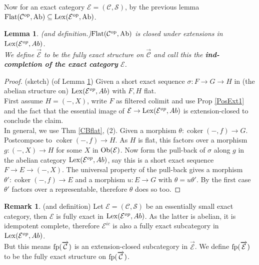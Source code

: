 \documentclass[11pt,a4paper]{amsart}
\theoremstyle{plain}
\newtheorem{lem}[thm]{Lemma}
\theoremstyle{definition}
\newtheorem{rem}[thm]{Remark}
\DeclareMathOperator{\coKer}{coker}
\newcommand{\mcC}{\mathcal{C}}
\newcommand{\mcE}{\mathcal{E}}
\newcommand{\mcS}{\mathcal{S}}
\begin{document}
Now for an exact category $\mcE=(\mcC, \mcS)$, by the previous lemma $\rm{Flat} (\mcC^{op},Ab)\subseteq {\rm Lex}(\mcE^{op},Ab)$.  
\begin{lem} (and definition.)\label{IndE}
   $\rm{Flat} (\mcC^{op},Ab)$ is closed under extensions in ${\rm Lex}(\mcE^{op},Ab)$. \\
   We define $\overrightarrow{\mcE}$ to be the fully exact structure on $\overrightarrow{\mcC}$ and call this the \textbf{ind-completion of the exact category} $\mcE$.   
\end{lem}


\begin{proof} (sketch) (of Lemma \ref{IndE})
Given a short exact sequence $\sigma \colon F \to G \to H$ in (the abelian structure on) ${\rm Lex}(\mcE^{op},Ab)$ with $F,H$ flat.  \\
First assume $H=(-,X)$, write $F$ as filtered colimit and use Prop \ref{PosExt1} and the fact that the essential image of $\mcE\to {\rm Lex}(\mcE^{op},Ab)$ is extension-closed to conclude the claim. \\
In general, we use Thm \ref{CBflat}, (2). Given a morphism $\theta\colon \coKer (-,f) \to G$. Postcompose to $\coKer (-,f)\to H$. As $H$ is flat, this factors over a morphism $g\colon (-,X)\to H$ for some $X$ in ${\rm Ob}(\mcE)$. Now form the pull-back of $\sigma$ along $g$ in the abelian category ${\rm Lex}(\mcE^{op},Ab)$, say this is a short exact sequence $F\to E \to (-,X)$. 
The universal property of the pull-back gives a morphism $\theta'\colon \coKer (-,f) \to E$ and a morphism $u \colon E \to G$ with $\theta = u\theta'$. By the first case $\theta'$ factors over a representable, therefore $\theta $ does so too.  
\end{proof}



\begin{rem} (and definition)
Let $\mcE=(\mcC, \mcS)$ be an essentially small exact category, then $\mcE$ is fully exact in ${\rm Lex}(\mcE^{op},Ab)$. As the latter is abelian, it is idempotent complete, therefore $\mcE^{ic}$ is also a fully exact subcategory in ${\rm Lex}(\mcE^{op},Ab)$.\\ 
But this means $\rm{fp}(\overrightarrow{\mcC})$ is an extension-closed subcategory in $\overrightarrow{\mcE}$. We define $\rm{fp}(\overrightarrow{\mcE})$ to be the fully exact structure on $\rm{fp}(\overrightarrow{\mcC})$. 
\end{rem}
\end{document}
